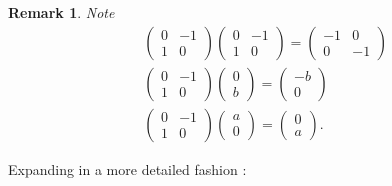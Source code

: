 \documentclass[aps,preprint]{revtex4}
\newtheorem{remark}[theorem]{Remark}
\begin{document}
\begin{remark}
Note 
\begin{align}
& \left( 
\begin{array}{cc}
0 & -1 \\ 
1 & 0%
\end{array}%
\right) \left( 
\begin{array}{cc}
0 & -1 \\ 
1 & 0%
\end{array}%
\right) =\left( 
\begin{array}{cc}
-1 & 0 \\ 
0 & -1%
\end{array}%
\right) \\
& \left( 
\begin{array}{cc}
0 & -1 \\ 
1 & 0%
\end{array}%
\right) \left( 
\begin{array}{c}
0 \\ 
b%
\end{array}%
\right) =\left( 
\begin{array}{c}
-b \\ 
0%
\end{array}%
\right) \\
& \left( 
\begin{array}{cc}
0 & -1 \\ 
1 & 0%
\end{array}%
\right) \left( 
\begin{array}{c}
a \\ 
0%
\end{array}%
\right) =\left( 
\begin{array}{c}
0 \\ 
a%
\end{array}%
\right) .
\end{align}
\end{remark}

Expanding in a more detailed fashion :
\end{document}
